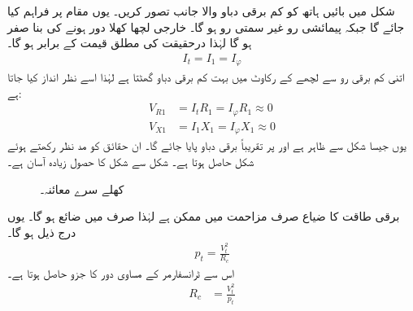 شکل    میں بائیں ہاتھ  کو کم برقی دباو والا جانب تصور کریں۔ یوں  مقام   پر فراہم کیا جائے گا جبکہ پیمائشی رو غیر سمتی رو  ہو  گا۔ خارجی لچھا کھلا دور ہونے کی بنا   صفر  ہو گا  لہٰذا   درحقیقت  کی مطلق قیمت  کے برابر ہو گا۔
\begin{align*}
I_t=I_1=I_\varphi
\end{align*}
اتنی کم برقی رو سے لچھے کے رکاوٹ میں بہت کم برقی دباو گھٹتا ہے لہٰذا اسے نظر انداز کیا جاتا ہے:
\begin{align*}
V_{R1}&=I_t R_1=I_\varphi R_1 \approx 0\\
V_{X1}&=I_1 X_1=I_\varphi X_1 \approx 0
\end{align*}
یوں  جیسا شکل   سے ظاہر ہے   اور  پر  تقریباً  برقی دباو پایا جائے گا۔ ان حقائق کو مد نظر رکھتے ہوئے شکل  حاصل ہوتا ہے۔ شکل  سے شکل  کا حصول  زیادہ آسان ہے۔
\begin{figure}
\centering
\caption{کھلے سرے معائنہ۔}
\label{شکل_ٹرانسفارمر_کھلے_سرے_معائنہ}
\end{figure}

برقی طاقت کا ضیاع صرف مزاحمت میں ممکن ہے لہٰذا  صرف    میں  ضائع ہو گا۔ یوں درج ذیل ہو گا۔
\begin{align*}
p_t=\frac{V_t^2}{R_c}
\end{align*}
اس سے ٹرانسفارمر کے مساوی دور کا جزو  حاصل ہوتا ہے۔
\begin{align}\label{مساوات_ٹرانسفارمر_کھلے_دور_مزاحمت_حاصل}
R_c&=\frac{V_t^2}{p_t}
\end{align}

